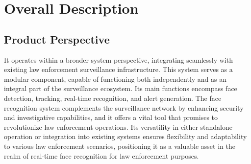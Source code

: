 \section{Overall Description}
    \subsection{Product Perspective}
        It operates within a broader system perspective, integrating seamlessly with existing law enforcement surveillance infrastructure. This system serves as a modular component, capable of functioning both independently and as an integral part of the surveillance ecosystem. Its main functions encompass face detection, tracking, real-time recognition, and alert generation. The face recognition system complements the surveillance network by enhancing security and investigative capabilities, and it offers a vital tool that promises to revolutionize law enforcement operations. Its versatility in either standalone operation or integration into existing systems ensures flexibility and adaptability to various law enforcement scenarios, positioning it as a valuable asset in the realm of real-time face recognition for law enforcement purposes.
    

